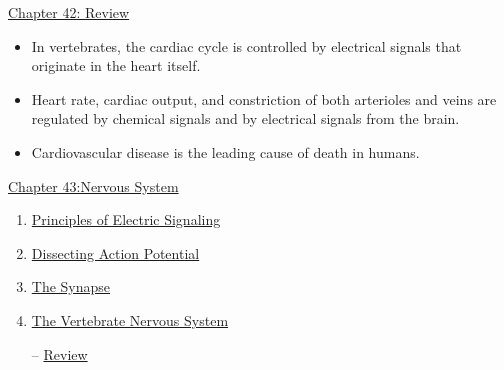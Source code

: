 \documentclass[12pt,letterpaper]{article}
\newcommand{\thetitle}{\hypertarget{home}{Animals and Ecology}}
\begin{document}
\begin{probbox}{\hyperlink{42}{Chapter 42: Review}}
{\begin{itemize}
        \item In vertebrates, the cardiac cycle is controlled by electrical signals that originate in the heart itself. 
        \item Heart rate, cardiac output, and constriction of both arterioles and veins are regulated by chemical signals and by electrical signals from the brain. 
        \item Cardiovascular disease is the leading cause of death in humans.
    \end{itemize}
}\end{probbox}


\clearpage

\renewcommand{\thetitle}{\hypertarget{43}{Nervous System}}
\hypertarget{43}{}
\setcounter{section}{43}

\begin{chapbox}{\hyperlink{home}{Chapter 43:Nervous System}}
    \begin{enumerate}
        \item \hyperlink{43.1}{Principles of Electric Signaling}
        \item \hyperlink{43.2}{Dissecting Action Potential}
        \item \hyperlink{43.3}{The Synapse}
        \item \hyperlink{43.4}{The Vertebrate Nervous System}
        \item [--] \hyperlink{43.r}{Review}
    \end{enumerate}
\end{chapbox}
\end{document}
